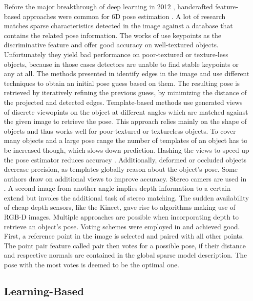 Before the major breakthrough of deep learning in 2012 \cite{alexnet}, handcrafted feature-based approaches were common for 6D pose estimation \cite{ylecun}. A lot of research matches sparse characteristics detected in the image against a database that contains the related pose information. The works of \cite{dglowe1, dwagner} use keypoints as the discriminative feature and offer good accuracy on well-textured objects. Unfortunately they yield bad performance on poor-textured or texture-less objects, because in those cases detectors are unable to find stable keypoints or any at all. The methods presented in \cite{gklein,dglowe2,charris} identify edges in the image and use different techniques to obtain an initial pose guess based on them. The resulting pose is retrieved by iteratively refining the previous guess, by minimizing the distance of the projected and detected edges.
\nnewline
Template-based methods \cite{hinterstoisser1, hinterstoisser2, rioscabrera, csteger} use generated views of discrete viewopints on the object at different angles which are matched against the given image to retrieve the pose. This approach relies mainly on the shape of objects and thus works well for poor-textured or textureless objects. To cover many objects and a large pose range the number of templates of an object has to be increased though, which slows down prediction. Hashing the views to speed up the pose estimator reduces accuracy \cite{zhou}. Additionally, deformed or occluded objects decrease precision, as templates globally reason about the object's pose.
\nnewline
Some authors draw on additional views to improve accuracy. Stereo camers are used in \cite{kpauwels}. A second image from another angle implies depth information to a certain extend but involes the additional task of stereo matching. The sudden availability of cheap depth sensors, like the Kinect, gave rise to algorithms making use of RGB-D images. Multiple approaches are possible when incorporating depth to retrieve an object's pose. Voting schemes were employed in \cite{bdrost, salasmoreno} and achieved good. First, a reference point in the image is selected and paired with all other points. The point pair feature called pair then votes for a possible pose, if their distance and respective normals are contained in the global sparse model description. The pose with the most votes is deemed to be the optimal one.

\subsection{Learning-Based}

